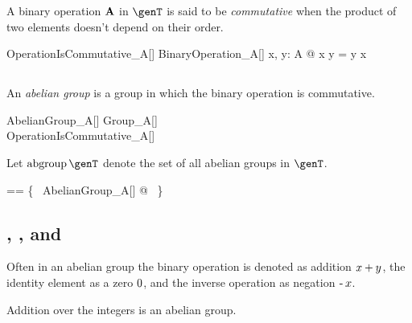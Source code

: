 \documentclass{amsart}
\begin{document}
A binary operation $\mathbf{A}$ in $\genT$ is said to be {\em commutative} when the product of two elements doesn't depend on 
their order.

\begin{schema}{OperationIsCommutative\_A}[\genT]
	BinaryOperation\_A[\genT]
\where
	\forall x, y: A @ x \mulA y = y \mulA x
\end{schema}

\subsection{}

An {\em abelian group} is a group in which the binary operation is commutative.
\begin{schema}{AbelianGroup\_A}[\genT]
	Group\_A[\genT] \\
	OperationIsCommutative\_A[\genT]
\end{schema}

Let $\abgroup \genT$ denote the set of all abelian groups in $\genT$.
\begin{zed}
\abgroup \genT == \{~ AbelianGroup\_A[\genT] @ \strucA ~\}
\end{zed}

\subsection{, , and }

Often in an abelian group the binary operation is denoted as addition $x \mathbin{+} y$,
the identity element as a zero $0$, and the inverse operation as negation $\operatorname{-} x$.

\begin{example}
Addition over the integers is an abelian group.

\begin{zed}
	(\num, (\_ + \_)) \in \abgroup \num
\end{zed}

\end{example}

\printbibliography
\end{document}
